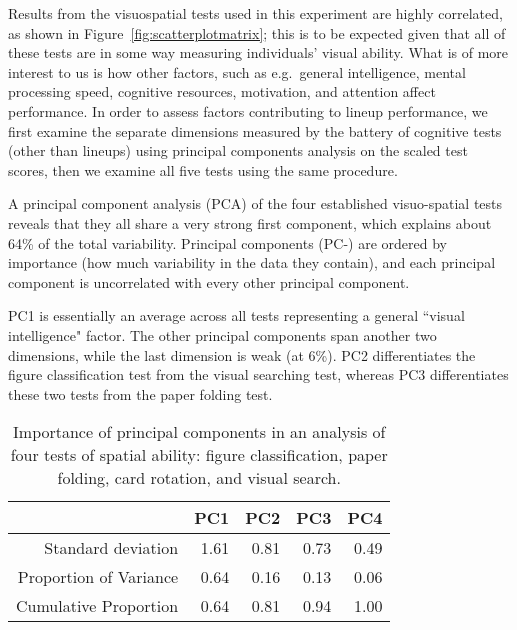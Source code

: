\documentclass[journal]{vgtc}\usepackage[]{graphicx}\usepackage[]{color}
\begin{document}
Results from the visuospatial tests used in this experiment are highly correlated, as shown in Figure~\ref{fig:scatterplotmatrix}; this is to be expected given that all of these tests are in some way measuring individuals' visual ability. 
What is of more interest to us is how other factors, such as e.g.~general intelligence, mental processing speed, cognitive resources, motivation, and attention affect performance. 
In order to assess factors contributing to lineup performance, we first examine the separate dimensions measured by the battery of cognitive tests (other than lineups) using principal components analysis on the scaled test scores, then we examine all five tests using the same procedure. 


A principal component analysis (PCA) of the four established visuo-spatial tests reveals that they all share a very strong first component, which explains about 64\% of the total variability. Principal components (PC-) are ordered by importance (how much variability in the data they contain), and each principal component is uncorrelated with every other principal component. 

PC1 is essentially an average across all tests representing a general ``visual intelligence" factor. The other principal components span another two dimensions, while the last dimension is weak (at 6\%). 
PC2 differentiates the figure classification test from the visual searching test, whereas PC3 differentiates these two tests from the paper folding test. 

\begin{table}[htb]
\centering
\caption{Importance of principal components in an analysis of four tests of spatial ability: figure classification, paper folding, card rotation, and visual search.\label{tab:PCAvariance4}} 
{\footnotesize
\begin{tabular}{rrrrr}
  \hline
 & PC1 & PC2 & PC3 & PC4 \\ 
  \hline
Standard deviation & 1.61 & 0.81 & 0.73 & 0.49 \\ 
  Proportion of Variance & 0.64 & 0.16 & 0.13 & 0.06 \\ 
  Cumulative Proportion & 0.64 & 0.81 & 0.94 & 1.00 \\ 
   \hline
\end{tabular}
}
\end{table}
\end{document}
